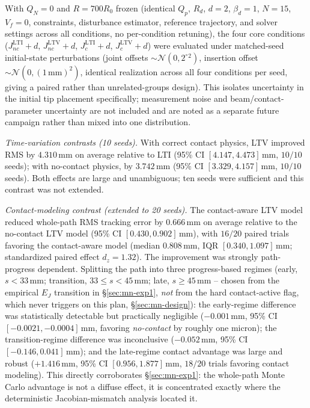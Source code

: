 \documentclass[journal]{IEEEtran}
\begin{document}
With $Q_N=0$ and $R=700R_0$ frozen (identical $Q_p$, $R_d$, $d=2$,
$\beta_d=1$, $N=15$, $V_f=0$, constraints, disturbance estimator,
reference trajectory, and solver settings across all conditions, no
per-condition retuning), the four core conditions ($J_{nc}^{\mathrm{LTI}}{+}d$,
$J_{nc}^{\mathrm{LTV}}{+}d$, $J_c^{\mathrm{LTI}}{+}d$,
$J_c^{\mathrm{LTV}}{+}d$) were evaluated under matched-seed initial-state
perturbations (joint offsets $\sim\mathcal N(0,2^\circ{}^2)$, insertion
offset $\sim\mathcal N(0,(1\,\mathrm{mm})^2)$, identical realization
across all four conditions per seed, giving a paired rather than
unrelated-groups design). This isolates uncertainty in the initial tip
placement specifically; measurement noise and beam/contact-parameter
uncertainty are not included and are noted as a separate future
campaign rather than mixed into one distribution.

\emph{Time-variation contrasts (10 seeds).} With correct contact
physics, LTV improved RMS by $4.310\,\mathrm{mm}$ on average relative
to LTI (95\% CI $[4.147,4.473]\,\mathrm{mm}$, $10/10$ seeds); with
no-contact physics, by $3.742\,\mathrm{mm}$ (95\% CI
$[3.329,4.157]\,\mathrm{mm}$, $10/10$ seeds). Both effects are large
and unambiguous; ten seeds were sufficient and this contrast was not
extended.

\emph{Contact-modeling contrast (extended to 20 seeds).} The
contact-aware LTV model reduced whole-path RMS tracking error by
$0.666\,\mathrm{mm}$ on average relative to the no-contact LTV model
(95\% CI $[0.430,0.902]\,\mathrm{mm}$), with $16/20$ paired trials
favoring the contact-aware model (median $0.808\,\mathrm{mm}$, IQR
$[0.340,1.097]\,\mathrm{mm}$; standardized paired effect
$d_z=1.32$). The improvement was strongly path-progress dependent.
Splitting the path into three progress-based regimes (early,
$s<33\,\mathrm{mm}$; transition, $33\le s<45\,\mathrm{mm}$; late,
$s\ge45\,\mathrm{mm}$ -- chosen from the empirical $E_J$ transition
in \S\ref{sec:mn-exp1}, \emph{not} from the hard contact-active flag,
which never triggers on this plan, \S\ref{sec:mn-design}):
the early-regime difference was statistically detectable but
practically negligible ($-0.001\,\mathrm{mm}$, 95\% CI
$[-0.0021,-0.0004]\,\mathrm{mm}$, favoring \emph{no-contact} by
roughly one micron); the transition-regime difference was inconclusive
($-0.052\,\mathrm{mm}$, 95\% CI $[-0.146,0.041]\,\mathrm{mm}$); and the
late-regime contact advantage was large and robust
($+1.416\,\mathrm{mm}$, 95\% CI $[0.956,1.877]\,\mathrm{mm}$, $18/20$
trials favoring contact modeling). This directly corroborates
\S\ref{sec:mn-exp1}: the whole-path Monte Carlo advantage is not a
diffuse effect, it is concentrated exactly where the deterministic
Jacobian-mismatch analysis located it.
\end{document}
